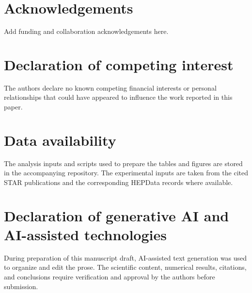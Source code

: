 \documentclass[preprint,12pt]{elsarticle}
\begin{document}
\section*{Acknowledgements}

Add funding and collaboration acknowledgements here.

\section*{Declaration of competing interest}

The authors declare no known competing financial interests or personal relationships that could have appeared to influence the work reported in this paper.

\section*{Data availability}

The analysis inputs and scripts used to prepare the tables and figures are stored in the accompanying repository. The experimental inputs are taken from the cited STAR publications and the corresponding HEPData records where available.

\section*{Declaration of generative AI and AI-assisted technologies}

During preparation of this manuscript draft, AI-assisted text generation was used to organize and edit the prose. The scientific content, numerical results, citations, and conclusions require verification and approval by the authors before submission.



\end{document}
